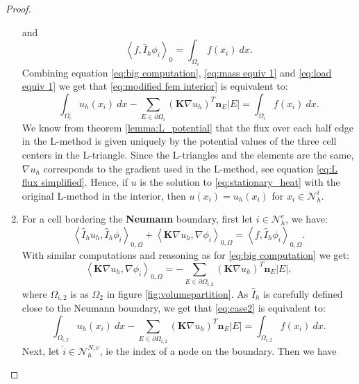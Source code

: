\documentclass[../Main/main.tex]{subfiles}
\begin{document}
\begin{proof}
\begin{enumerate}
\begin{equation}
			\end{equation}
			and
			\begin{equation}\label{eq:load equiv 1}
				\left \langle f,\hat{I}_h \phi_i \right \rangle_0 = \int_{\Omega_i}f(x_i) \ dx.
			\end{equation}
			Combining equation \eqref{eq:big computation}, \eqref{eq:mass equiv 1} and \eqref{eq:load equiv 1} we get that \eqref{eq:modified fem interior} is equivalent to:
			\begin{equation}
				\int_{\Omega_i}u_h(x_i) \ dx - \sum_{E\in \partial \Omega_i} (\pmb{K}\nabla u_h)^T \pmb{n}_E |E| = \int_{\Omega_i}f(x_i) \ dx.
			\end{equation}
			We know from theorem \ref{lemma:L_potential} that the flux over each half edge in the L-method is given uniquely by the potential values of the three cell centers in the L-triangle. Since the L-triangles and the elements are the same, $\nabla u_h$ corresponds to the gradient used in the L-method, see equation \eqref{eq:L flux simplified}. Hence, if $u$ is the solution to \eqref{eq:stationary_heat} with the original L-method in the interior, then $u(x_i)=u_h(x_i)$ for $x_i\in \mathcal{N}^i_h$. 
			\item For a cell bordering the \textbf{Neumann} boundary, first let $i\in \mathcal{N}_h^e$, we have:
			\begin{equation}\label{eq:case2}
				\left \langle \hat{I}_h u_h,\hat{I}_h \phi_i \right \rangle_{0,\Omega} +   \left \langle \pmb{K} \nabla u_h,\nabla \phi_i \right \rangle_{0,\Omega} = \left \langle f,\hat{I}_h \phi_i \right \rangle_{0,\Omega}.
			\end{equation}
			With similar computations and reasoning as for \eqref{eq:big computation} we get:
			\begin{equation}
					\left \langle \pmb{K} \nabla u_h,\nabla \phi_i \right \rangle_{0,\Omega}= 
					- \sum_{E\in \partial \Omega_{i,2}} (\pmb{K}\nabla u_h)^T \pmb{n}_E |E|, 
			\end{equation}
			where $\Omega_{i,2}$ is as $\Omega_2$ in figure \ref{fig:volumepartition}. As $\hat{I}_h$ is carefully defined close to the Neumann boundary, we get that \eqref{eq:case2} is equivalent to:
			\begin{equation}\label{eq:FVML neumann cell}	\int_{\Omega_{i,2}}u_h(x_i) \ dx - \sum_{E\in \partial \Omega_{i,2}} (\pmb{K}\nabla u_h)^T \pmb{n}_E |E| = \int_{\Omega_{i,2}}f(x_i) \ dx.
			\end{equation}
			Next, let $\hat{i} \in \mathcal{N}_h^{N,e}$, ie the index of a node on the boundary. Then we have 

\end{enumerate}
\end{proof}
\end{document}
